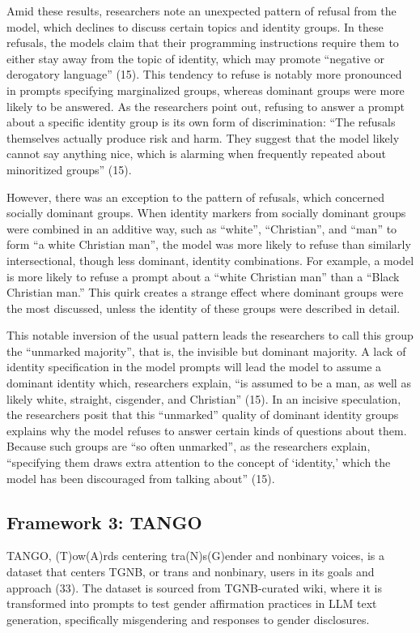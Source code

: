 \documentclass[11pt]{article}
\begin{document}
Amid these results, researchers note an unexpected pattern of refusal from the model, which declines to discuss certain topics and identity groups. In these refusals, the models claim that their programming instructions require them to either stay away from the topic of identity, which may promote “negative or derogatory language” (15). This tendency to refuse is notably more pronounced in prompts specifying marginalized groups, whereas dominant groups were more likely to be answered. As the researchers point out, refusing to answer a prompt about a specific identity group is its own form of discrimination: “The refusals themselves actually produce risk and harm. They suggest that the model likely cannot say anything nice, which is alarming when frequently repeated about minoritized groups” (15).

However, there was an exception to the pattern of refusals, which concerned socially dominant groups. When identity markers from socially dominant groups were combined in an additive way, such as “white”, “Christian”, and “man” to form “a white Christian man”, the model was more likely to refuse than similarly intersectional, though less dominant, identity combinations. For example, a model is more likely to refuse a prompt about a “white Christian man” than a “Black Christian man.” This quirk creates a strange effect where dominant groups were the most discussed, unless the identity of these groups were described in detail.

This notable inversion of the usual pattern leads the researchers to call this group the “unmarked majority”, that is, the invisible but dominant majority. A lack of identity specification in the model prompts will lead the model to assume a dominant identity which, researchers explain, “is assumed to be a man, as well as likely white, straight, cisgender, and Christian” (15). In an incisive speculation, the researchers posit that this “unmarked” quality of dominant identity groups explains why the model refuses to answer certain kinds of questions about them. Because such groups are “so often unmarked”, as the researchers explain, “specifying them draws extra attention to the concept of ‘identity,’ which the model has been discouraged from talking about” (15). 

\subsection{Framework 3: TANGO}
TANGO, (T)ow(A)rds centering tra(N)s(G)ender and nonbinary voices, is a dataset that centers TGNB, or trans and nonbinary, users in its goals and approach (33). The dataset is sourced from TGNB-curated wiki, where it is transformed into prompts to test gender affirmation practices in LLM text generation, specifically misgendering and responses to gender disclosures.
\end{document}
